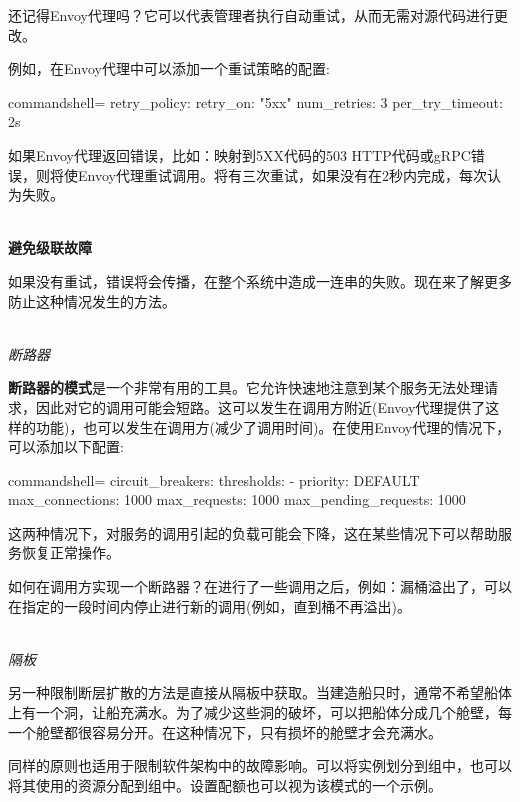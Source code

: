 还记得Envoy代理吗？它可以代表管理者执行自动重试，从而无需对源代码进行更改。

例如，在Envoy代理中可以添加一个重试策略的配置:

\begin{tcblisting}{commandshell={}}
retry_policy:
  retry_on: "5xx"
  num_retries: 3
  per_try_timeout: 2s
\end{tcblisting}

如果Envoy代理返回错误，比如：映射到5XX代码的503 HTTP代码或gRPC错误，则将使Envoy代理重试调用。将有三次重试，如果没有在2秒内完成，每次认为失败。

\hspace*{\fill} \\ %
\noindent
\textbf{避免级联故障}

如果没有重试，错误将会传播，在整个系统中造成一连串的失败。现在来了解更多防止这种情况发生的方法。

\hspace*{\fill} \\ %
\noindent
\textit{断路器}

\textbf{断路器的模式}是一个非常有用的工具。它允许快速地注意到某个服务无法处理请求，因此对它的调用可能会短路。这可以发生在调用方附近(Envoy代理提供了这样的功能)，也可以发生在调用方(减少了调用时间)。在使用Envoy代理的情况下，可以添加以下配置:

\begin{tcblisting}{commandshell={}}
circuit_breakers:
  thresholds:
    - priority: DEFAULT
      max_connections: 1000
      max_requests: 1000
      max_pending_requests: 1000
\end{tcblisting}

这两种情况下，对服务的调用引起的负载可能会下降，这在某些情况下可以帮助服务恢复正常操作。

如何在调用方实现一个断路器？在进行了一些调用之后，例如：漏桶溢出了，可以在指定的一段时间内停止进行新的调用(例如，直到桶不再溢出)。

\hspace*{\fill} \\ %
\noindent
\textit{隔板}

另一种限制断层扩散的方法是直接从隔板中获取。当建造船只时，通常不希望船体上有一个洞，让船充满水。为了减少这些洞的破坏，可以把船体分成几个舱壁，每一个舱壁都很容易分开。在这种情况下，只有损坏的舱壁才会充满水。

同样的原则也适用于限制软件架构中的故障影响。可以将实例划分到组中，也可以将其使用的资源分配到组中。设置配额也可以视为该模式的一个示例。

